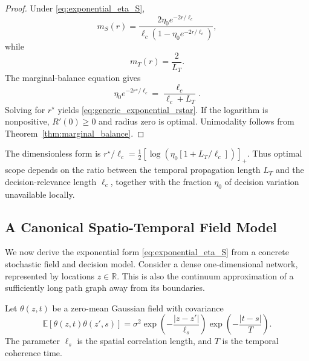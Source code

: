 \documentclass[11pt]{article}
\begin{document}
\begin{proof}
Under \eqref{eq:exponential_eta_S},
\begin{equation}
    m_S(r)
    =
    \frac{
        2\eta_0e^{-2r/\ell_c}
    }{
        \ell_c
        \left(
            1-\eta_0e^{-2r/\ell_c}
        \right)
    },
    \label{eq:exponential_mS}
\end{equation}
while
\begin{equation}
    m_T(r)
    =
    \frac{2}{L_T}.
    \label{eq:linear_mT}
\end{equation}
The marginal-balance equation gives
\begin{equation}
    \eta_0e^{-2r^\star/\ell_c}
    =
    \frac{
        \ell_c
    }{
        \ell_c+L_T
    }.
    \label{eq:eta_at_optimum}
\end{equation}
Solving for $r^\star$ yields
\eqref{eq:generic_exponential_rstar}. If the logarithm is nonpositive,
$R'(0)\ge0$ and radius zero is optimal. Unimodality follows from
Theorem~\ref{thm:marginal_balance}.
\end{proof}

The dimensionless form is
$r^\star/\ell_c=\tfrac12[\log(\eta_0[1+L_T/\ell_c])]_+$.
Thus optimal scope depends on the ratio between the temporal propagation
length $L_T$ and the decision-relevance length $\ell_c$, together with the
fraction $\eta_0$ of decision variation unavailable locally.

\subsection{A Canonical Spatio-Temporal Field Model}
\label{subsec:canonical_line_model}

We now derive the exponential form
\eqref{eq:exponential_eta_S} from a concrete stochastic field and decision
model. Consider a dense one-dimensional network, represented by locations
$z\in\mathbb{R}$. This is also the continuum approximation of a sufficiently
long path graph away from its boundaries.

Let $\theta(z,t)$ be a zero-mean Gaussian field with covariance
\begin{equation}
    \mathbb{E}
    \left[
        \theta(z,t)\theta(z',s)
    \right]
    =
    \sigma^2
    \exp
    \left(
        -\frac{|z-z'|}{\ell_s}
    \right)
    \exp
    \left(
        -\frac{|t-s|}{T}
    \right).
    \label{eq:canonical_space_time_covariance}
\end{equation}
The parameter $\ell_s$ is the spatial correlation length, and $T$ is the
temporal coherence time.
\end{document}
